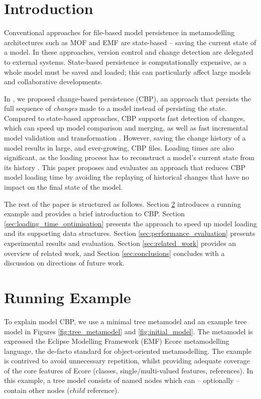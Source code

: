 \documentclass{llncs}
\begin{document}
    \section{Introduction}
    \label{sec:introduction}
    Conventional approaches for file-based model persistence in metamodelling architectures such as MOF \cite{omg2018mof} and EMF \cite{steinberg2008emf} are state-based -- saving the current state of a model.  In these approaches,  version control and change detection are delegated to external systems.  State-based persistence is computationally expensive, as a whole model must be saved and loaded; this can particularly affect large models and collaborative developments.
    
    In \cite{yohannis2017turning}, we proposed change-based persistence (CBP), an approach that persists the full sequence of \emph{changes} made to a model instead of persisting the state. Compared to state-based approaches, CBP supports fast detection of changes, which can speed up model comparison and merging, as well as fast incremental model validation and transformation \cite{rath2012derived,ogunyomi2015property}. However, saving the change history of a model results in large, and ever-growing, CBP files.  Loading times are also significant, as the loading process has to reconstruct a model's current state from its history \cite{yohannis2017turning}.   This paper proposes and evaluates an approach that reduces CBP model loading time by avoiding the replaying of historical changes that have no impact on the final state of the model.
    
    The rest of the paper is structured as follows. Section \ref{sec:case_study} introduces a running example and provides a brief introduction to CBP.
    Section \ref{sec:loading_time_optimisation} presents the approach to speed up model loading and its supporting data structures. Section \ref{sec:performance_evaluation} presents experimental results and evaluation. Section \ref{sec:related_work} provides an overview of related work, and Section \ref{sec:conclusions} concludes with a discussion on directions of future work.
    
    \vspace{-15pt}
    \section{Running Example}
    \label{sec:case_study}
    \vspace{-10pt}
    To explain model CBP, we use a minimal tree metamodel and an example tree model in Figures \ref{fig:tree_metamodel} and \ref{fig:initial_model}.
    The metamodel is expressed the Eclipse Modelling Framework (EMF) Ecore metamodelling language, the de-facto standard for object-oriented metamodelling.  The example is contrived to avoid unnecessary repetition, whilst providing adequate coverage of the core features of Ecore (classes, single/multi-valued features, references).
    In this example, a tree model consists of named nodes which can -- optionally -- contain other nodes ($child$ reference).
    
\end{document}
